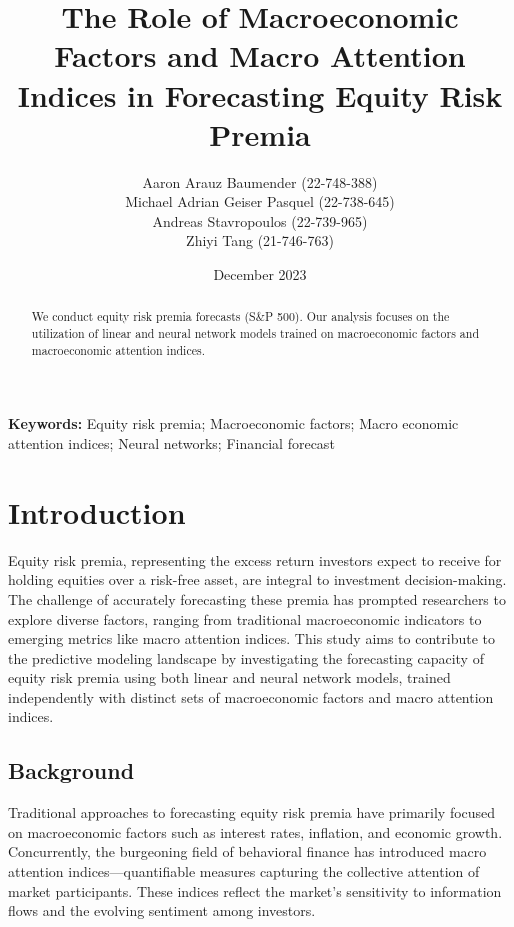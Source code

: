 \documentclass{article}
\title{The Role of Macroeconomic Factors and Macro Attention Indices in Forecasting Equity Risk Premia}
\author{Aaron Arauz Baumender (22-748-388) 
\\ Michael Adrian Geiser Pasquel (22-738-645)
\\ Andreas Stavropoulos (22-739-965)
\\ Zhiyi Tang (21-746-763)}
\affil{University of Zurich}
\date{December 2023}
\providecommand{\keywords}[1]{\small \textbf{Keywords:} #1}
\begin{document}
\maketitle

\begin{abstract} 
\noindent We conduct equity risk premia forecasts (S\&P 500). Our analysis focuses on the utilization of linear and neural network models trained on macroeconomic factors and macroeconomic attention indices.
\end{abstract}

\hfill

\noindent \keywords{Equity risk premia; Macroeconomic factors; Macro economic attention indices; Neural networks; Financial forecast}\\

\newpage

\tableofcontents

\newpage

\section{Introduction}

Equity risk premia, representing the excess return investors expect to receive for holding equities over a risk-free asset, are integral to investment decision-making. The challenge of accurately forecasting these premia has prompted researchers to explore diverse factors, ranging from traditional macroeconomic indicators to emerging metrics like macro attention indices. This study aims to contribute to the predictive modeling landscape by investigating the forecasting capacity of equity risk premia using both linear and neural network models, trained independently with distinct sets of macroeconomic factors and macro attention indices.

\subsection{Background}

Traditional approaches to forecasting equity risk premia have primarily focused on macroeconomic factors such as interest rates, inflation, and economic growth. Concurrently, the burgeoning field of behavioral finance has introduced macro attention indices—quantifiable measures capturing the collective attention of market participants. These indices reflect the market's sensitivity to information flows and the evolving sentiment among investors.
\end{document}
